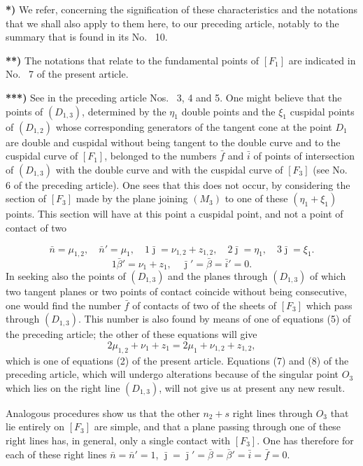 \documentclass{article}
\begin{document}
\textbf{*)} We refer, concerning the signification of these characteristics and the notations that we shall also apply to them here, to our preceding article, notably to the summary that is found in its No.~ 10.

\textbf{**)} The notations that relate to the fundamental points of $[F_1]$ are indicated in No.~ 7 of the present article.

\textbf{***)} See in the preceding article Nos.~ 3, 4 and 5. One might believe that the points of $(D_{1, 3})$, determined by the $\eta_1$ double points and the $\xi_1$ cuspidal points of $(D_{1, 2})$ whose corresponding generators of the tangent cone at the point $D_1$ are double and cuspidal without being tangent to the double curve and to the cuspidal curve of $[F_1]$, belonged to the numbers $\bar{f}$ and $\bar{i}$ of points of intersection of $(D_{1, 3})$ with the double curve and with the cuspidal curve of $[F_3]$ (see No.~ 6 of the preceding article). One sees that this does not occur, by considering the section of $[F_3]$ made by the plane joining $(M_3)$ to one of these $(\eta_1 + \xi_1)$ points. This section will have at this point a cuspidal point, and not a point of contact of two

\[
\bar{n} = \mu_{1, 2}, \quad \bar{n}' = \mu_1, \quad 1\bar{\jmath} = \nu_{1, 2} + z_{1, 2}, \quad 2\bar{\jmath} = \eta_1, \quad 3\bar{\jmath} = \xi_1.
\]
\[
1\bar{\beta}' = \nu_1 + z_1, \quad \bar{\jmath}' = \bar{\beta} = \bar{i}' = 0.
\]
In seeking also the points of $(D_{1, 3})$ and the planes through $(D_{1, 3})$ of which two tangent planes or two points of contact coincide without being consecutive, one would find the number $\bar{f}$ of contacts of two of the sheets of $[F_3]$ which pass through $(D_{1, 3})$. This number is also found by means of one of equations (5) of the preceding article; the other of these equations will give
\[
2\mu_{1, 2} + \nu_1 + z_1 = 2\mu_1 + \nu_{1, 2} + z_{1, 2},
\]
which is one of equations (2) of the present article. Equations (7) and (8) of the preceding article, which will undergo alterations because of the singular point $O_3$ which lies on the right line $(D_{1, 3})$, will not give us at present any new result.

Analogous procedures show us that the other $n_2 + s$ right lines through $O_3$ that lie entirely on $[F_3]$ are simple, and that a plane passing through one of these right lines has, in general, only a single contact with $[F_3]$. One has therefore for each of these right lines $\bar{n} = \bar{n}' = 1$, $\bar{\jmath} = \bar{\jmath}' = \bar{\beta} = \bar{\beta}' = \bar{i} = \bar{f} = 0$.
\end{document}

